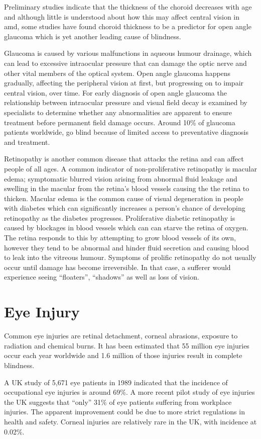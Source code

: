 Preliminary studies indicate that the thickness of the choroid decreases
with age and although little is understood about how this may affect
central vision in \acrshort{amd}, some studies have found
choroid thickness to be a predictor for open angle glaucoma which
is yet another leading cause of blindness.\cite{margolis2009pilot,gordon2002ocular}

Glaucoma is caused by various malfunctions in aqueous humour
drainage, which can lead to excessive intraocular pressure that can
damage the optic nerve and other vital members of the optical system.
\cite{distelhorst2003open}
Open angle glaucoma happens gradually, affecting the peripheral vision
at first, but progressing on to impair central vision, over time. For early
diagnosis of open angle glaucoma the relationship between intraocular
pressure and visual field decay is examined by specialists to determine
whether any abnormalities are apparent to ensure treatment before
permanent field damage occurs.\cite{goldmann1972open} Around
10\% of glaucoma patients worldwide, go blind because of limited
access to preventative diagnosis and treatment.\cite{west2000looking}

Retinopathy is another common disease that attacks the retina and 
can affect people of all ages. A common indicator of non-proliferative
retinopathy is macular edema; symptomatic blurred vision arising from
abnormal fluid leakage and swelling in the \gls{macular} from the retina's
blood vessels causing the the retina to thicken.\cite{hee1995quantitative}
Macular edema is the common cause of visual degeneration in people
with diabetes which can significantly increases a person's chance of
developing retinopathy as the diabetes progresses.\cite{klein1984wisconsin}
Proliferative diabetic retinopathy is caused by blockages in blood vessels
which can can starve the retina of oxygen. The retina responds to this by
attempting to grow blood vessels of its own, however they tend to be
abnormal and hinder fluid secretion and causing blood to leak into the 
vitreous humour. Symptoms of prolific retinopathy do not usually occur 
until damage has become irreversible. In that case, a sufferer would
experience seeing \enquote{floaters}, \enquote{shadows} as well as
loss of vision.

\section{Eye Injury}

Common eye injuries are retinal detachment, corneal abrasions, exposure to
radiation and chemical burns. It has been estimated that 55 million eye injuries
occur each year worldwide and 1.6 million of those injuries result in complete
blindness.\cite{negrel1998global}

A UK study of 5,671 eye patients in 1989 indicated that the incidence of
occupational eye injuries is around 69\%.\cite{macewen1989eye} A more
recent pilot study of eye injuries the UK suggests that \enquote{only} 31\%
of eye patients suffering from workplace injuries.\cite{thompson2009occupational}
The apparent improvement could be due to more strict regulations in health
and safety. Corneal injuries are relatively rare in the UK, with incidence at
0.02\%.\cite{macdonald2009surveillance}
